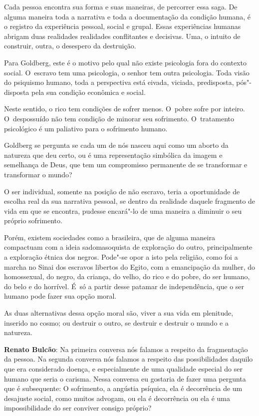 Cada pessoa encontra sua forma e suas maneiras, de percorrer essa saga.
De alguma maneira toda a narrativa e toda a documentação da condição
humana, é o registro da experiência pessoal, social e grupal. Essas
experiências humanas abrigam duas realidades realidades conflitantes e
decisivas. Uma, o intuito de construir, outra, o desespero da
destruição.

Para Goldberg, este é o motivo pelo qual não existe psicologia fora do
contexto social. O~escravo tem uma psicologia, o senhor tem outra
psicologia. Toda visão do psiquismo humano, toda a perspectiva está
eivada, viciada, predisposta, pós"-disposta pela sua condição econômica e
social.

Neste sentido, o rico tem condições de sofrer menos. O~pobre sofre por
inteiro. O~despossuído não tem condição de minorar seu sofrimento. O~tratamento psicológico é um paliativo para o sofrimento humano.

Goldberg se pergunta se cada um de nós nasceu aqui como um aborto da
natureza que deu certo, ou é uma representação simbólica da imagem e
semelhança de Deus, que tem um compromisso permanente de se transformar
e transformar o mundo?

O ser individual, somente na posição de não escravo, teria a
oportunidade de escolha real da sua narrativa pessoal, se dentro da
realidade daquele fragmento de vida em que se encontra, pudesse
encará"-lo de uma maneira a diminuir o seu próprio sofrimento.

Porém, existem sociedades como a brasileira, que de alguma maneira
compactuam com a ideia sadomasoquista de exploração do outro,
principalmente a exploração étnica dos negros. Pode"-se opor a isto pela
religião, como foi a marcha no Sinai dos escravos libertos do Egito, com
a emancipação da mulher, do homossexual, do negro, da criança, do velho,
do rico e do pobre, do ser humano, do belo e do horrível. É~só a partir
desse patamar de independência, que o ser humano pode fazer sua opção
moral.

As duas alternativas dessa opção moral são, viver a sua vida em
plenitude, inserido no cosmo; ou destruir o outro, se destruir e
destruir o mundo e a natureza.

\begin{center}\asterisc{}\end{center}

\abrefala
 

\textbf{Renato Bulcão}: Na primeira conversa nós falamos a respeito da
fragmentação da pessoa. Na segunda conversa nós falamos a respeito das
possibilidades daquilo que era considerado doença, e especialmente de
uma qualidade especial do ser humano que seria o carisma. Nessa conversa
eu gostaria de fazer uma pergunta que é subsequente: O sofrimento, a
angústia psíquica, ela é decorrência de um desajuste social, como muitos
advogam, ou ela é decorrência ou ela é uma impossibilidade do ser
conviver consigo próprio?

